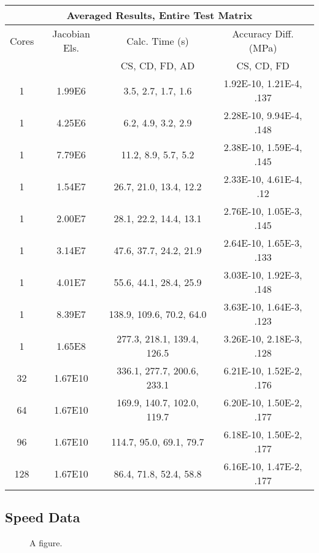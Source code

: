 \documentclass[preprint,12pt]{elsarticle}
\begin{document}
\begin{center}
    \begin{tabular}{c c c c }
    \hline
    \multicolumn{4}{c}{Averaged Results, Entire Test Matrix} \\ \hline
    Cores & Jacobian Els. & Calc. Time (s) & Accuracy Diff. (MPa)\\ 
    \multicolumn{2}{c}{} & CS, CD, FD, AD & CS, CD, FD \\ \hline 
	1 & 1.99E6  & 3.5, 2.7, 1.7, 1.6 & 1.92E-10, 1.21E-4, .137 \\ \hline
	1 & 4.25E6  & 6.2, 4.9, 3.2, 2.9 & 2.28E-10, 9.94E-4, .148 \\ \hline
	1 & 7.79E6  & 11.2, 8.9, 5.7, 5.2 & 2.38E-10, 1.59E-4, .145\\ \hline
	1 & 1.54E7  & 26.7, 21.0, 13.4, 12.2 & 2.33E-10, 4.61E-4, .12 \\ \hline
	1 & 2.00E7  & 28.1, 22.2, 14.4, 13.1 & 2.76E-10, 1.05E-3, .145 \\ \hline
	1 & 3.14E7  & 47.6, 37.7, 24.2, 21.9 & 2.64E-10, 1.65E-3, .133 \\ \hline
	1 & 4.01E7  & 55.6, 44.1, 28.4, 25.9 & 3.03E-10, 1.92E-3, .148 \\ \hline
	1 & 8.39E7  & 138.9, 109.6, 70.2, 64.0 & 3.63E-10, 1.64E-3, .123 \\ \hline
	1 & 1.65E8  & 277.3, 218.1, 139.4, 126.5 & 3.26E-10, 2.18E-3, .128 \\ \hline
	32 & 1.67E10  & 336.1, 277.7, 200.6, 233.1 & 6.21E-10, 1.52E-2, .176 \\ \hline
	64 & 1.67E10  & 169.9, 140.7, 102.0, 119.7 & 6.20E-10, 1.50E-2, .177 \\ \hline
	96 & 1.67E10  & 114.7, 95.0, 69.1, 79.7 & 6.18E-10, 1.50E-2, .177 \\ \hline
	128 & 1.67E10  & 86.4, 71.8, 52.4, 58.8 & 6.16E-10, 1.47E-2, .177 \\ \hline
    \end{tabular}
\end{center}

\subsection{Speed Data}

\begin{figure}[h]
  \scalebox{1.0}{}
  \caption{A figure.}
  \label{fig:serial_speed}
\end{figure}

\end{document}
